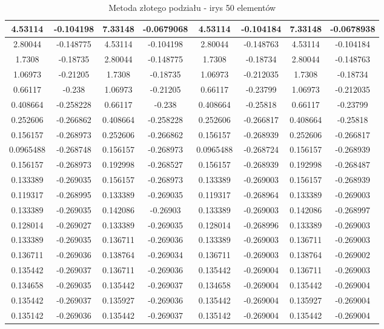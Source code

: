 \begin{table}[H]
{\begin{tabular}{|c|c|c|c|c|c|c|c|}
4.53114   & -0.104198    & 7.33148  & -0.0679068   & 4.53114   & -0.104184    & 7.33148  & -0.0678938   \\ \hline
2.80044   & -0.148775    & 4.53114  & -0.104198    & 2.80044   & -0.148763    & 4.53114  & -0.104184    \\ \hline
1.7308    & -0.18735     & 2.80044  & -0.148775    & 1.7308    & -0.18734     & 2.80044  & -0.148763    \\ \hline
1.06973   & -0.21205     & 1.7308   & -0.18735     & 1.06973   & -0.212035    & 1.7308   & -0.18734     \\ \hline
0.66117   & -0.238       & 1.06973  & -0.21205     & 0.66117   & -0.23799     & 1.06973  & -0.212035    \\ \hline
0.408664  & -0.258228    & 0.66117  & -0.238       & 0.408664  & -0.25818     & 0.66117  & -0.23799     \\ \hline
0.252606  & -0.266862    & 0.408664 & -0.258228    & 0.252606  & -0.266817    & 0.408664 & -0.25818     \\ \hline
0.156157  & -0.268973    & 0.252606 & -0.266862    & 0.156157  & -0.268939    & 0.252606 & -0.266817    \\ \hline
0.0965488 & -0.268748    & 0.156157 & -0.268973    & 0.0965488 & -0.268724    & 0.156157 & -0.268939    \\ \hline
0.156157  & -0.268973    & 0.192998 & -0.268527    & 0.156157  & -0.268939    & 0.192998 & -0.268487    \\ \hline
0.133389  & -0.269035    & 0.156157 & -0.268973    & 0.133389  & -0.269003    & 0.156157 & -0.268939    \\ \hline
0.119317  & -0.268995    & 0.133389 & -0.269035    & 0.119317  & -0.268964    & 0.133389 & -0.269003    \\ \hline
0.133389  & -0.269035    & 0.142086 & -0.26903     & 0.133389  & -0.269003    & 0.142086 & -0.268997    \\ \hline
0.128014  & -0.269027    & 0.133389 & -0.269035    & 0.128014  & -0.268996    & 0.133389 & -0.269003    \\ \hline
0.133389  & -0.269035    & 0.136711 & -0.269036    & 0.133389  & -0.269003    & 0.136711 & -0.269003    \\ \hline
0.136711  & -0.269036    & 0.138764 & -0.269034    & 0.136711  & -0.269003    & 0.138764 & -0.269002    \\ \hline
0.135442  & -0.269037    & 0.136711 & -0.269036    & 0.135442  & -0.269004    & 0.136711 & -0.269003    \\ \hline
0.134658  & -0.269035    & 0.135442 & -0.269037    & 0.134658  & -0.269004    & 0.135442 & -0.269004    \\ \hline
0.135442  & -0.269037    & 0.135927 & -0.269036    & 0.135442  & -0.269004    & 0.135927 & -0.269004    \\ \hline
0.135142  & -0.269036    & 0.135442 & -0.269037    & 0.135142  & -0.269004    & 0.135442 & -0.269004    \\ \hline
\end{tabular}%
}
\caption{Metoda złotego podziału - irys 50 elementów}
\end{table}